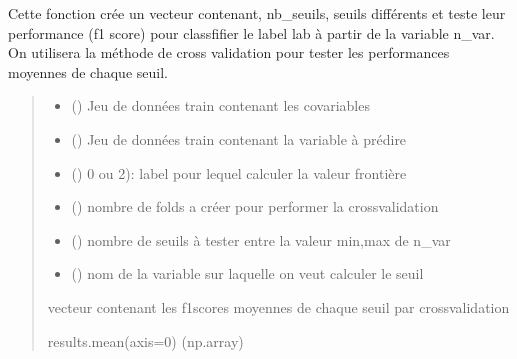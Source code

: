 \documentclass[letterpaper,10pt,french]{sphinxmanual}
\begin{document}
\begin{fulllineitems}
\label{\detokenize{methode_fait_maison:methode_fait_maison.frontiere}}
\pysigstartsignatures
{}
\pysigstopsignatures
\sphinxAtStartPar
Cette fonction crée un vecteur contenant, nb\_seuils, seuils différents et teste leur performance (f1 score)
pour classfifier le label lab à partir de la variable n\_var. On utilisera la méthode de cross validation pour tester les performances
moyennes de chaque seuil.
\begin{quote}\begin{description}
\begin{itemize}
\item {} 
\sphinxAtStartPar
{} () \textendash{} Jeu de données train contenant les co\sphinxhyphen{}variables

\item {} 
\sphinxAtStartPar
{} () \textendash{} Jeu de données train contenant la variable à prédire

\item {} 
\sphinxAtStartPar
\sphinxstyleliteralstrong{\sphinxupquote{(}} () \textendash{} 0 ou 2): label pour lequel calculer la valeur frontière

\item {} 
\sphinxAtStartPar
{} () \textendash{} nombre de folds a créer pour performer la cross\sphinxhyphen{}validation

\item {} 
\sphinxAtStartPar
{} () \textendash{} nombre de seuils à tester entre la valeur min,max de n\_var

\item {} 
\sphinxAtStartPar
{} () \textendash{} nom de la variable sur laquelle on veut calculer le seuil

\end{itemize}

\sphinxAtStartPar
vecteur contenant les f1\sphinxhyphen{}scores moyennes de chaque seuil par cross\sphinxhyphen{}validation

\sphinxAtStartPar
results.mean(axis=0) (np.array)

\end{description}\end{quote}

\end{fulllineitems}
\end{document}
